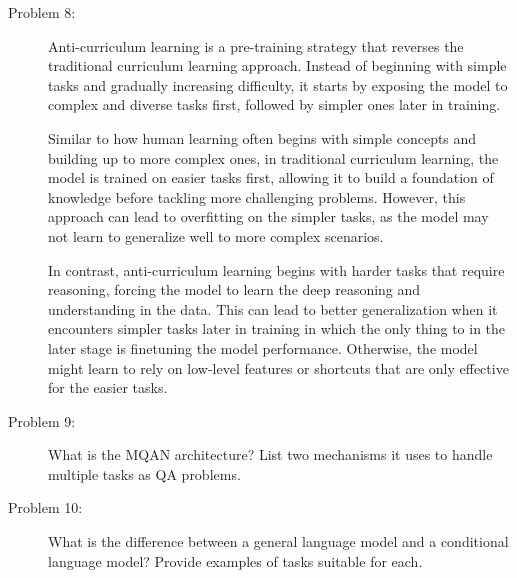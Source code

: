\documentclass[10pt]{article}
\begin{document}
\begin{description}
\item[Problem 8:] \hfill %

Anti-curriculum learning is a pre-training strategy that reverses the traditional curriculum learning approach. 
Instead of beginning with simple tasks and gradually increasing difficulty, it starts by exposing the model to 
complex and diverse tasks first, followed by simpler ones later in training.

Similar to how human learning often begins with simple concepts and building up to more complex ones, in traditional curriculum learning,
the model is trained on easier tasks first, allowing it to build a foundation of knowledge before tackling more challenging problems.
However, this approach can lead to overfitting on the simpler tasks, as the model may not learn to generalize well to more complex scenarios.

In contrast, anti-curriculum learning begins with harder tasks that require reasoning, forcing the model to learn the deep reasoning and understanding in the data.
This can lead to better generalization when it encounters simpler tasks later in training in which the only thing to in the later stage is finetuning the model performance.
Otherwise, the model might learn to rely on low-level features or shortcuts that are only effective for the easier tasks.

\pagebreak

\item[Problem 9:] What is the MQAN architecture? List two mechanisms it uses to handle multiple tasks as QA problems.

\pagebreak

\item[Problem 10:] What is the difference between a general language model and a conditional language model? Provide examples of tasks suitable for each.

\end{description}
\end{document}
